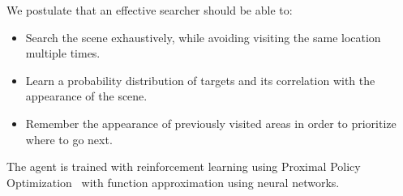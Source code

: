 



We postulate that an effective searcher should be able to:

\begin{itemize}
    \item Search the scene exhaustively, while avoiding visiting the same location multiple times.
    \item Learn a probability distribution of targets and its correlation with the appearance of the scene.
    \item Remember the appearance of previously visited areas in order to prioritize where to go next.
\end{itemize}

The agent is trained with reinforcement learning using Proximal Policy Optimization~\cite{proxim} with function approximation using neural networks.






